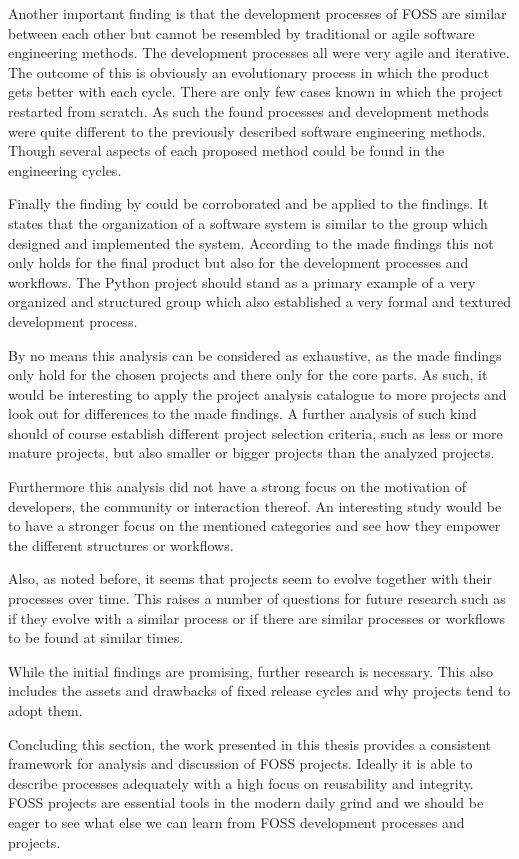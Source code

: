 Another important finding is that the development processes of \ac{FOSS} are
similar between each other but cannot be resembled by traditional or agile
software engineering methods. The development processes all were very agile and
iterative. The outcome of this is obviously an evolutionary process in which
the product gets better with each cycle. There are only few cases known in
which the project restarted from scratch. As such the found processes and
development methods were quite different to the previously described software
engineering methods. Though several aspects of each proposed method could be
found in the engineering cycles.

Finally the finding by \textcite{Conway1968} could be corroborated and be
applied to the findings. It states that the organization of a software system
is similar to the group which designed and implemented the system. According to
the made findings this not only holds for the final product but also for the
development processes and workflows. The Python project should stand as a
primary example of a very organized and structured group which also established
a very formal and textured development process.

By no means this analysis can be considered as exhaustive, as the made findings
only hold for the chosen projects and there only for the core parts. As such,
it would be interesting to apply the project analysis catalogue to more
projects and look out for differences to the made findings. A further analysis
of such kind should of course establish different project selection criteria,
such as less or more mature projects, but also smaller or bigger projects than
the analyzed projects.

Furthermore this analysis did not have a strong focus on the motivation of
developers, the community or interaction thereof. An interesting study would be
to have a stronger focus on the mentioned categories and see how they empower
the different structures or workflows.

Also, as noted before, it seems that projects seem to evolve together with
their processes over time. This raises a number of questions for future
research such as if they evolve with a similar process or if there are similar
processes or workflows to be found at similar times.

While the initial findings are promising, further research is necessary. This
also includes the assets and drawbacks of fixed release cycles and why projects
tend to adopt them.

Concluding this section, the work presented in this thesis provides a
consistent framework for analysis and discussion of \ac{FOSS} projects. Ideally
it is able to describe processes adequately with a high focus on reusability
and integrity. \acl{FOSS} projects are essential tools in the modern
daily grind and we should be eager to see what else we can learn from
\acl{FOSS} development processes and projects.

